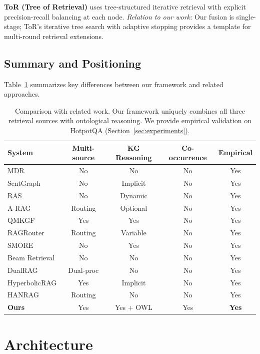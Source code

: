 \documentclass[11pt,a4paper]{article}
\begin{document}
\textbf{ToR (Tree of Retrieval)} \citep{tor2025} uses tree-structured iterative retrieval with explicit precision-recall balancing at each node. \textit{Relation to our work:} Our fusion is single-stage; ToR's iterative tree search with adaptive stopping provides a template for multi-round retrieval extensions.

\subsection{Summary and Positioning}

Table~\ref{tab:related_work} summarizes key differences between our framework and related approaches.

\begin{table}[h]
\centering
\small
\begin{tabular}{lcccc}
\toprule
\textbf{System} & \textbf{Multi-source} & \textbf{KG Reasoning} & \textbf{Co-occurrence} & \textbf{Empirical} \\
\midrule
MDR & No & No & No & Yes \\
SentGraph & No & Implicit & No & Yes \\
RAS & No & Dynamic & No & Yes \\
A-RAG & Routing & Optional & No & Yes \\
QMKGF & Yes & Yes & No & Yes \\
RAGRouter & Routing & Variable & No & Yes \\
SMORE & No & Yes & No & Yes \\
Beam Retrieval & No & No & No & Yes \\
DualRAG & Dual-proc & No & No & Yes \\
HyperbolicRAG & Yes & Implicit & No & Yes \\
HANRAG & Routing & No & No & Yes \\
\midrule
\textbf{Ours} & Yes & Yes + OWL & Yes & \textbf{Yes} \\
\bottomrule
\end{tabular}
\caption{Comparison with related work. Our framework uniquely combines all three retrieval sources with ontological reasoning. We provide empirical validation on HotpotQA (Section~\ref{sec:experiments}).}
\label{tab:related_work}
\end{table}

\section{Architecture}
\label{sec:architecture}
\end{document}
